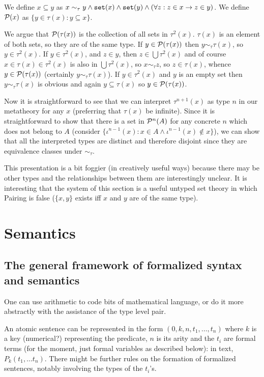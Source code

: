 \documentclass[12pt]{article}
\begin{document}
We define $x \subseteq y$ as $x \sim_{\tau} y  \wedge {\tt set}(x)\wedge {\tt set}(y) \wedge (\forall z:z \in x \rightarrow z \in y)$.  We define ${\cal P}(x)$ as $\{y \in \tau(x):y \subseteq x\}$.

We argue that ${\cal P}(\tau(x))$ is the collection of all sets in $\tau^2(x)$.  $\tau(x)$ is an element of both sets, so they are of the same type.  If $y \in {\cal P}(\tau(x))$ then $y \sim_{\tau} \tau(x)$, so
$y \in \tau^2(x)$.  If $y \in \tau^2(x)$, and $z \in y$, then $z \in \bigcup \tau^2(x)$ and of course $x \in \tau(x) \in \tau^2(x)$ is also in $\bigcup \tau^2(x)$, so $x \sim_{\tau} z$, so
$z \in \tau(x)$, whence $y \in {\cal P}(\tau(x))$ (certainly $y \sim_{\tau} \tau(x)$).  If $y \in \tau^2(x)$ and $y$ is an empty set then $y \sim_{\tau} \tau(x)$ is obvious and again
$y \subseteq \tau(x)$ so $y \in {\cal P}(\tau(x))$.

Now it is straightforward to see that we can interpret $\tau^{n+1}(x)$ as type $n$ in our metatheory for any $x$ (preferring that $\tau(x)$ be infinite).  Since it is straightforward to show that there is a set
in ${\cal P}^n(A)$ for any concrete $n$ which does not belong to $A$ (consider $\{\iota^{n-1}(x):x \in A \wedge \iota^{n-1}(x) \not\in x\}$), we can show that all the interpreted types are distinct and therefore disjoint since they are equivalence classes
under $\sim_{\tau}$.

This presentation is a bit foggier (in creatively useful ways) because there may be other types and the relationships between them are interestingly unclear.  It is interesting that the system of this section is a useful untyped set theory in which Pairing is false ($\{x,y\}$ exists iff $x$ and $y$ are of the same type).

\section{Semantics}

\subsection{The general framework of formalized syntax and semantics}

One can use arithmetic to code bits of mathematical language, or do it more abstractly with the assistance of the type level pair.

An atomic sentence can be represented in the form $(0,k,n,t_1,\ldots,t_n)$ where $k$ is a key (numerical?) representing the predicate, $n$ is its arity and the $t_i$ are formal terms (for the moment, just formal variables as described below):  in text, $P_k(t_1,\ldots t_n)$.  There might be further rules on the formation of formalized sentences, notably involving the types of the $t_i$'s.
\end{document}

